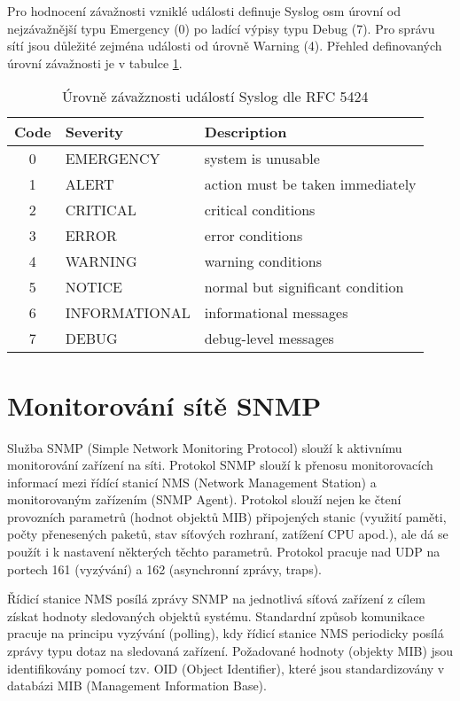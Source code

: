 Pro hodnocení závažnosti vzniklé události definuje Syslog osm úrovní od nejzávažnější typu Emergency (0) po ladící výpisy typu Debug (7). Pro správu sítí jsou důležité zejména události od úrovně Warning (4). Přehled definovaných úrovní závažnosti je v tabulce \ref{tab:severity}. 
\begin{table}[h]
  \centering
  \small
  \begin{tabular}{|c|l|l|}
    \hline
    \bf Code & \bf Severity & \bf Description \\
    \hline
    0 & EMERGENCY & system is unusable  \\
    1 & ALERT & action must be taken immediately\\
    2 & CRITICAL & critical conditions \\
    3 & ERROR & error conditions\\
    4 & WARNING & warning conditions\\
    5 & NOTICE & normal but significant condition\\
    6 & INFORMATIONAL & informational messages\\
    7 & DEBUG & debug-level messages\\
    \hline
  \end{tabular}
  \caption{Úrovně závažznosti událostí Syslog dle RFC 5424 \cite{rfc5424}}\label{tab:severity}
\end{table}


\clearpage
\section{Monitorování sítě SNMP}\label{snmp}

Služba SNMP (Simple Network Monitoring Protocol) slouží k aktivnímu monitorování zařízení na síti. Protokol SNMP \cite{rfc3412} slouží k přenosu monitorovacích informací mezi řídící stanicí NMS (Network Management Station) a monitorovaným zařízením (SNMP Agent). Protokol slouží nejen ke čtení provozních parametrů (hodnot objektů MIB) připojených stanic (využití paměti, počty přenesených paketů, stav síťových rozhraní, zatížení CPU apod.), ale dá se použít i k  nastavení některých těchto parametrů. Protokol pracuje nad UDP na portech 161 (vyzývání) a 162 (asynchronní zprávy, traps).

Řídicí stanice NMS posílá zprávy SNMP na jednotlivá síťová zařízení z cílem získat hodnoty sledovaných objektů systému. Standardní způsob komunikace pracuje na principu vyzývání (polling), kdy řídicí stanice NMS periodicky posílá zprávy typu dotaz na sledovaná zařízení. Požadované hodnoty (objekty MIB) jsou identifikovány pomocí tzv. OID (Object Identifier), které jsou standardizovány v databázi MIB (Management Information Base).

